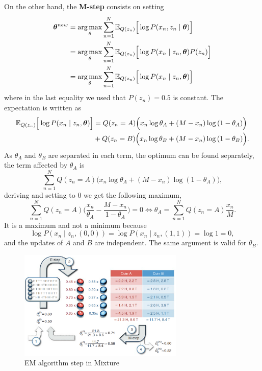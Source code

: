 On the other hand, the \textbf{M-step} consists on setting
\[
  \begin{aligned}
    \bm{\theta}^{new} &= \operatorname*{arg\,max}_{\theta} \sum_{n=1}^{N}\mathbb{E}_{Q(z_{n})}\Big[\log P(x_{n}, z_{n} \mid \bm{\theta})\Big]\\
    &= \operatorname*{arg\,max}_{\theta} \sum_{n=1}^{N}\mathbb{E}_{Q(z_{n})}\Big[\log P(x_{n} \mid z_{n}, \bm{\theta})P(z_{n})\Big]\\
    &= \operatorname*{arg\,max}_{\theta} \sum_{n=1}^{N}\mathbb{E}_{Q(z_{n})}\Big[\log P(x_{n} \mid z_{n}, \bm{\theta})\Big]
  \end{aligned}
\]
where in the last equality we used that \(P(z_{n}) = 0.5\) is constant. The expectation is written as
\[
  \begin{aligned}
    \mathbb{E}_{Q(z_{n})}\Big[\log P(x_{n} \mid z_{n}, \bm{\theta})\Big] &= Q(z_{n} = A)\Big( x_{n}\log{\theta_{A}} + (M - x_{n})\log{(1 - \theta_{A})} \Big)\\
    &+ Q(z_{n} = B)\Big( x_{n}\log{\theta_{B}} + (M - x_{n})\log{(1 - \theta_{B})} \Big).
  \end{aligned}
\]
As \(\theta_{A}\) and \(\theta_{B}\) are separated in each term, the optimum can be found separately, the term affected by \(\theta_{A}\) is
\[
  \sum_{n=1}^{N} Q(z_{n}=A) \Big(x_{n}\log{\theta_{A}} + (M - x_{n})\log{(1-\theta_{A})}\Big),
\]
deriving and setting to \(0\) we get the following maximum,
\[
  \sum_{n=1}^{N}Q(z_{n}=A)\Big(\frac{x_{n}}{\theta_{A}} - \frac{M - x_{n}}{1- \theta_{A}}\Big) = 0 \iff \theta_{A} = \sum_{n=1}^{N}Q(z_{n}=A)\frac{x_{n}}{M}.
\]
It is a maximum and not a minimum because
\[
  \log P(x_{n}\mid z_{n},(0,0)) = \log P(x_{n} \mid z_{n}, (1,1)) = \log 1 = 0,
\]
and the updates of \(A\) and \(B\) are independent. The same argument is valid for \(\theta_{B}\).

\begin{figure}
  \centering
  \includegraphics[width=0.7\textwidth]{tex/images/mixture}
  \caption{EM algorithm step in Mixture~\cite{do2008expectation}}\label{fig:mixture}
\end{figure}

